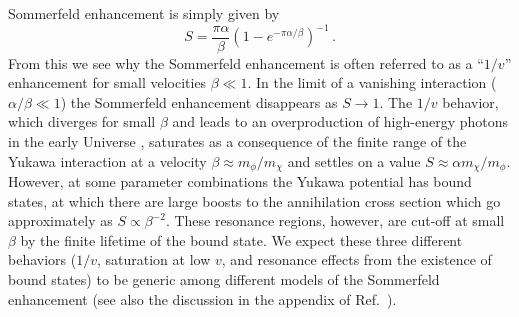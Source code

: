 \documentclass[aps,prd,twocolumn,amsmath,amssymb,floatfix,nofootinbib,10pt]{revtex4}
\newcommand{\somm}{\ensuremath{S}}
\newcommand{\mdm}{\ensuremath{m_{\chi}}}
\newcommand{\mv}{\ensuremath{m_{\phi}}}
\begin{document}
Sommerfeld enhancement is simply given by
\begin{equation}
\somm = \frac{\pi \alpha}{\beta} (1 - e^{-\pi\alpha/\beta})^{-1}\, .
\end{equation}
From this we see why the Sommerfeld enhancement is often referred to
as a ``$1/v$'' enhancement for small velocities $\beta \ll 1$. In the
limit of a vanishing interaction ($\alpha/\beta \ll 1$) the Sommerfeld
enhancement disappears as $\somm \rightarrow 1$. The $1/v$ behavior,
which diverges for small $\beta$ and leads to an overproduction of
high-energy photons in the early Universe \cite{2008arXiv0810.3233K},
saturates as a consequence of the finite range of the Yukawa
interaction at a velocity $\beta \approx \mv/\mdm$ and settles on a
value $\somm \approx \alpha \mdm/\mv$. However, at some parameter
combinations the Yukawa potential has bound states, at which there are
large boosts to the annihilation cross section which go approximately
as $\somm \propto \beta^{-2}$. These resonance regions, however, are
cut-off at small $\beta$ by the finite lifetime of the bound state. We
expect these three different behaviors ($1/v$, saturation at low $v$,
and resonance effects from the existence of bound states) to be
generic among different models of the Sommerfeld enhancement (see also
the discussion in the appendix of Ref.~\cite{ArkaniHamed:2008qn}).
\end{document}
